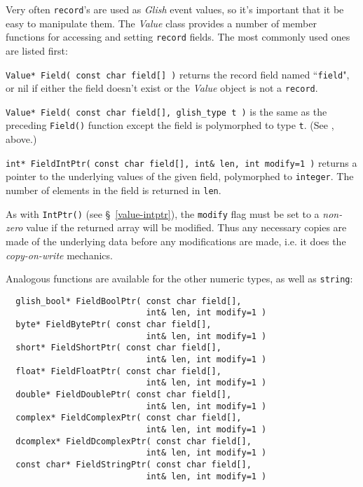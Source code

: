 \label{record-manipulation}
Very often {\tt record}'s are used as {\em Glish} event values, so it's
important that it be easy to manipulate them.  The {\em Value} class
provides a number of member functions for accessing and setting
{\tt record} fields.  The most commonly used ones are 
listed first:
\begin{sloppy}
\begin{list}{}{}

\item[{\tt Value* Field( const char field[] )}]
returns the record
field named ``{\tt field}", or nil if either the field doesn't exist
or the {\em Value} object is not a {\tt record}.

\item[{\tt Value* Field( const char field[], glish\_type t )}] is the
same as the preceding {\tt Field()} function except the field is
polymorphed to type {\tt t}. (See , above.)

\item[{\tt int* FieldIntPtr(}] {\tt const char field[], int\& len, int modify=1 )} returns
a pointer to the underlying values of the given field, polymorphed
to {\tt integer}.  The number of elements in the field is returned
in {\tt len}.

As with {\tt IntPtr()} (see \S~\ref{value-intptr}), the {\tt modify} flag
must be set to a {\em non-zero} value if the returned array will be
modified. Thus any necessary copies are made of the underlying data
before any modifications are made, i.e. it does the {\em copy-on-write}
mechanics.

Analogous functions are available for the other numeric types, as well
as {\tt string}:
\begin{verbatim}
  glish_bool* FieldBoolPtr( const char field[],
                            int& len, int modify=1 )
  byte* FieldBytePtr( const char field[],
                            int& len, int modify=1 )
  short* FieldShortPtr( const char field[],
                            int& len, int modify=1 )
  float* FieldFloatPtr( const char field[],
                            int& len, int modify=1 )
  double* FieldDoublePtr( const char field[],
                            int& len, int modify=1 )
  complex* FieldComplexPtr( const char field[],
                            int& len, int modify=1 )
  dcomplex* FieldDcomplexPtr( const char field[],
                            int& len, int modify=1 )
  const char* FieldStringPtr( const char field[],
                            int& len, int modify=1 )
\end{verbatim}


\end{list}
\end{sloppy}
